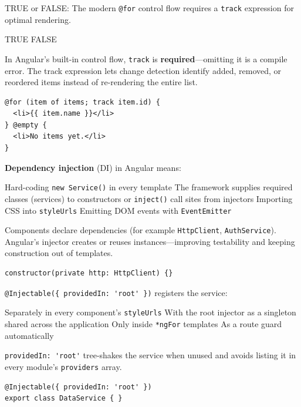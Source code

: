 \question[4]
TRUE or FALSE: The modern \lstinline[style=htmlinline]|@for| control flow requires a \lstinline[style=htmlinline]|track| expression for optimal rendering.
\begin{choices}
  \CorrectChoice TRUE
  \choice FALSE
\end{choices}
\begin{solution}
  In Angular's built-in control flow, \lstinline[style=htmlinline]|track| is \textbf{required}---omitting it is a compile error. The track expression lets change detection identify added, removed, or reordered items instead of re-rendering the entire list.
\begin{lstlisting}[style=htmlinline]
@for (item of items; track item.id) {
  <li>{{ item.name }}</li>
} @empty {
  <li>No items yet.</li>
}
\end{lstlisting}
\end{solution}

\question[4]
\textbf{Dependency injection} (DI) in Angular means:
\begin{choices}
  \choice Hard-coding \lstinline[style=tsinline]|new Service()| in every template
  \CorrectChoice The framework supplies required classes (services) to constructors or \lstinline[style=tsinline]|inject()| call sites from injectors
  \choice Importing CSS into \lstinline[style=tsinline]|styleUrls|
  \choice Emitting DOM events with \lstinline[style=tsinline]|EventEmitter|
\end{choices}
\begin{solution}
  Components declare dependencies (for example \lstinline[style=tsinline]|HttpClient|, \lstinline[style=tsinline]|AuthService|). Angular's injector creates or reuses instances---improving testability and keeping construction out of templates.
\begin{lstlisting}[style=ts]
constructor(private http: HttpClient) {}
\end{lstlisting}
\end{solution}



\newpage



\question[4]
\lstinline[style=tsinline]|@Injectable({ providedIn: 'root' })| registers the service:
\begin{choices}
  \choice Separately in every component's \lstinline[style=tsinline]|styleUrls|
  \CorrectChoice With the root injector as a singleton shared across the application
  \choice Only inside \lstinline[style=htmlinline]|*ngFor| templates
  \choice As a route guard automatically
\end{choices}
\begin{solution}
  \lstinline[style=tsinline]|providedIn: 'root'| tree-shakes the service when unused and avoids listing it in every module's \lstinline[style=tsinline]|providers| array.
\begin{lstlisting}[style=ts]
@Injectable({ providedIn: 'root' })
export class DataService { }
\end{lstlisting}
\end{solution}

